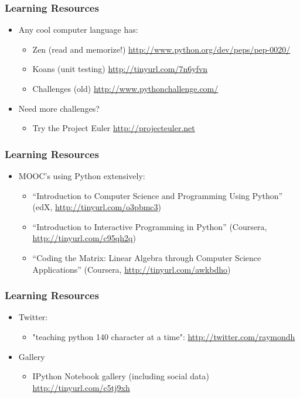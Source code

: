 \documentclass{beamer}
\begin{document}
\begin{frame}[fragile]
\frametitle{Learning Resources}
\begin{itemize}
\item Any cool computer language has:
\begin{itemize}
\item Zen (read and memorize!)
      \url{http://www.python.org/dev/peps/pep-0020/}
\item Koans (unit testing)
      \url{http://tinyurl.com/7n6yfvn}
\item Challenges (old)
      \url{http://www.pythonchallenge.com/}
\end{itemize}
\item Need more challenges?
\begin{itemize}
\item Try the Project Euler
      \url{http://projecteuler.net}
\end{itemize}
\end{itemize}
\end{frame}

\begin{frame}[fragile]
\frametitle{Learning Resources}
\begin{itemize}
\item MOOC's using Python extensively:
\begin{itemize}
\item ``Introduction to Computer Science and 
      Programming Using Python'' 
      (edX, \url{http://tinyurl.com/o3pbmc3})
\item ``Introduction to Interactive Programming in Python''
      (Coursera, \url{http://tinyurl.com/c95qh2q})
\item ``Coding the Matrix: Linear Algebra through Computer
      Science Applications'' (Coursera, 
      \url{http://tinyurl.com/awkbdho})
\end{itemize}
\end{itemize}
\end{frame}

\begin{frame}[fragile]
\frametitle{Learning Resources}
\begin{itemize}
\item Twitter:
\begin{itemize}
\item "teaching python 140 character at a time": 
      \url{http://twitter.com/raymondh}
\end{itemize}
\item Gallery
\begin{itemize}
\item IPython Notebook gallery (including social data)
      \url{http://tinyurl.com/c5tj9xh}
\end{itemize}
\end{itemize}
\end{frame}
\end{document}
